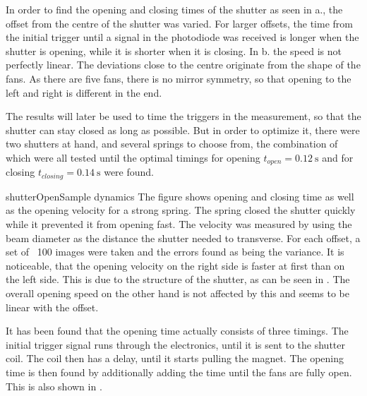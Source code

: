 
In order to find the opening and closing times of the shutter as seen in a., the offset from the centre of the shutter was varied. For larger offsets, the time from the initial trigger until a signal in the photodiode was received is longer when the shutter is opening, while it is shorter when it is closing.
In b. the speed is not perfectly linear. The deviations close to the centre originate from the shape of the fans. As there are five fans, there is no mirror symmetry, so that opening to the left and right is different in the end.

The results will later be used to time the triggers in the measurement, so that the shutter can stay closed as long as possible. But in order to optimize it, there were two shutters at hand, and several springs to choose from, the combination of which were all tested until the optimal timings for opening $t_{open}=\SI{0.12}{\second}$ and for closing $t_{closing}=\SI{0.14}{\second}$ were found.

\pltCustom{
	\begin{center}
		
		
	\end{center}
}
{shutterOpen}{Sample dynamics}{
	The figure shows opening and closing time as well as the opening velocity for a strong spring. The spring closed the shutter quickly while it prevented it from opening fast.
	The velocity was measured by using the beam diameter as the distance the shutter needed to transverse. For each offset, a set of ~100 images were taken and the errors found as being the variance. It is noticeable, that the opening velocity on the right side is faster at first than on the left side. This is due to the structure of the shutter, as can be seen in .
	The overall opening speed on the other hand is not affected by this and seems to be linear with the offset.
}

It has been found that the opening time actually consists of three timings. The initial trigger signal runs through the electronics, until it is sent to the shutter coil. The coil then has a delay, until it starts pulling the magnet. The opening time is then found by additionally adding the time until the fans are fully open. This is also shown in .

